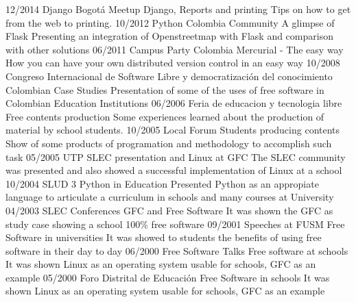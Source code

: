 \begin{entrylist}
  \entry
    {12/2014}
    {Django Bogotá Meetup}
    {Django, Reports and printing}
    {Tips on how to get from the web to printing.}
  \entry
    {10/2012}
    {Python Colombia Community}
    {A glimpse of Flask}
    {Presenting an integration  of Openstreetmap with Flask and
    comparison with other solutions}
  \entry
    {06/2011}
    {Campus Party Colombia}
    {Mercurial - The easy way}
    {How you can have your own distributed version control in an easy way}
  \entry
    {10/2008}
    {Congreso Internacional de Software Libre y
    democratización del conocimiento}
    {Colombian Case Studies}
    {Presentation of some of the uses of free software in Colombian
    Education Institutions}
  \entry
    {06/2006}
    {Feria de educacion y tecnologia libre}
    {Free contents production}
    {Some experiences learned about the production of material
    by school students.}
  \entry
    {10/2005}
    {Local Forum}
    {Students producing contents}
    {Show of
    some products of programation and methodology to accomplish such task}
  \entry
    {05/2005}
    {UTP}
    {SLEC presentation and  Linux at GFC}
    {The SLEC
    community was presented and also showed a successful implementation of
    Linux at a school}
  \entry
    {10/2004}
    {SLUD 3}
    {Python in Education}
    {Presented Python as an
    appropiate language to articulate a curriculum in schools and many
    courses at University}
  \entry
    {04/2003}
    {SLEC Conferences}
    {GFC and Free Software}
    {It was shown the GFC as
    study case showing a school 100\% free software}
  \entry
    {09/2001}
    {Speeches at FUSM}
    {Free Software in
    universities}
    {It was showed to students the benefits of using free
    software in their day to day}
  \entry
    {06/2000}
    {Free Software Talks}
    {Free software at schools}
    {It was shown Linux as an operating system usable for schools, GFC as an example}
  \entry
    {05/2000}
    {Foro Distrital de Educación}
    {Free Software in
    schools}
    {It was shown Linux as an operating system usable for schools, GFC as an example}
\end{entrylist}
